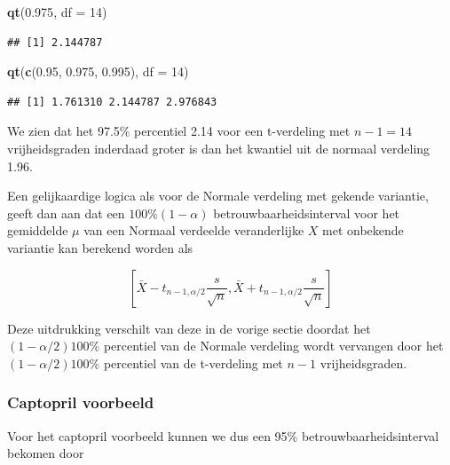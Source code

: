 \documentclass[
  12pt,dutch]{book}
\newenvironment{Shaded}{\begin{snugshade}}{\end{snugshade}}
\newcommand{\AttributeTok}[1]{\textcolor[rgb]{0.13,0.29,0.53}{#1}}
\newcommand{\DecValTok}[1]{\textcolor[rgb]{0.00,0.00,0.81}{#1}}
\newcommand{\FloatTok}[1]{\textcolor[rgb]{0.00,0.00,0.81}{#1}}
\newcommand{\FunctionTok}[1]{\textcolor[rgb]{0.13,0.29,0.53}{\textbf{#1}}}
\newcommand{\NormalTok}[1]{#1}
\theoremstyle{definition}
\theoremstyle{definition}
\theoremstyle{definition}
\theoremstyle{definition}
\theoremstyle{remark}
\begin{document}
\begin{Shaded}
\begin{Highlighting}[]
\FunctionTok{qt}\NormalTok{(}\FloatTok{0.975}\NormalTok{, }\AttributeTok{df =} \DecValTok{14}\NormalTok{)}
\end{Highlighting}
\end{Shaded}

\begin{verbatim}
## [1] 2.144787
\end{verbatim}

\begin{Shaded}
\begin{Highlighting}[]
\FunctionTok{qt}\NormalTok{(}\FunctionTok{c}\NormalTok{(}\FloatTok{0.95}\NormalTok{, }\FloatTok{0.975}\NormalTok{, }\FloatTok{0.995}\NormalTok{), }\AttributeTok{df =} \DecValTok{14}\NormalTok{)}
\end{Highlighting}
\end{Shaded}

\begin{verbatim}
## [1] 1.761310 2.144787 2.976843
\end{verbatim}

We zien dat het 97.5\% percentiel 2.14 voor een t-verdeling met \(n-1=14\) vrijheidsgraden inderdaad groter is dan het kwantiel uit de normaal verdeling 1.96.

Een gelijkaardige logica als voor de Normale verdeling met gekende variantie, geeft dan aan dat een \(100\% (1-\alpha)\) betrouwbaarheidsinterval voor het gemiddelde \(\mu\) van een
Normaal verdeelde veranderlijke \(X\) met onbekende variantie kan berekend
worden als

\begin{equation*}
\left[\bar{X} - t_{n-1, \alpha/2} \frac{s}{\sqrt{n}} , \bar{X} + t_{n-1,
\alpha/2} \frac{s}{\sqrt{n}}\right]
\end{equation*}

Deze uitdrukking verschilt van deze in de vorige sectie doordat het \((1-\alpha/2)100\%\) percentiel van de Normale verdeling wordt vervangen door
het \((1-\alpha/2)100\%\) percentiel van de t-verdeling met \(n-1\)
vrijheidsgraden.

\subsubsection{Captopril voorbeeld}\label{captopril-voorbeeld-1}

Voor het captopril voorbeeld kunnen we dus een 95\% betrouwbaarheidsinterval bekomen door
\end{document}
